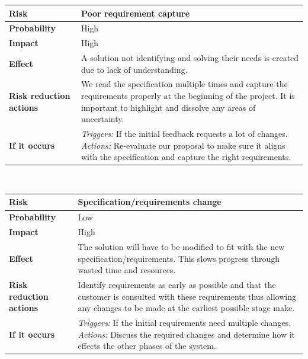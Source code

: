 \noindent
\begin{tabular}{|l || p{10.3cm}|}
\hline
\textbf{Risk} & Poor requirement capture \\ \hline
\textbf{Probability} & High \\ \hline
\textbf{Impact} & High \\ \hline
\textbf{Effect} & A solution not identifying and solving their needs is created due to lack of understanding. \\ \hline
\textbf{Risk reduction actions} & We read the specification multiple times and capture the requirements properly at the beginning of the project.  It is important to highlight and dissolve any areas of uncertainty. \\ \hline
\textbf{If it occurs} & \emph{Triggers:} If the initial feedback requests a lot of changes. \emph{Actions:} Re-evaluate our proposal to make sure it aligns with the specification and capture the right requirements.\\
\hline
\end{tabular}\\
\vspace{0.5cm}

\noindent
\begin{tabular}{|l || p{10.3cm}|}
\hline
\textbf{Risk} & Specification/requirements change\\ \hline
\textbf{Probability} & Low \\ \hline
\textbf{Impact} & High \\ \hline
\textbf{Effect} & The solution will have to be modified to fit with the new specification/requirements.  This slows progress through wasted time and resources.   \\ \hline
\textbf{Risk reduction actions} & Identify requirements as early as possible and that the customer is consulted with these requirements thus allowing any changes to be made at the earliest possible stage make. \\ \hline
\textbf{If it occurs} & \emph{Triggers:} If the initial requirements need multiple changes. \emph{Actions:} Discuss the required changes and determine how it effects the other phases of the system.\\
\hline
\end{tabular}\\
\vspace{0.5cm}

